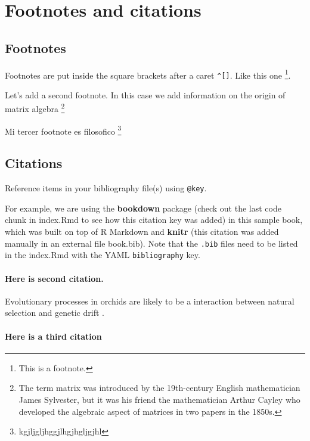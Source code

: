 \documentclass[
]{book}
\theoremstyle{definition}
\theoremstyle{definition}
\theoremstyle{definition}
\theoremstyle{definition}
\theoremstyle{remark}
\begin{document}
\hypertarget{footnotes-and-citations}{%
\chapter{Footnotes and citations}\label{footnotes-and-citations}}

\hypertarget{footnotes}{%
\section{Footnotes}\label{footnotes}}

Footnotes are put inside the square brackets after a caret \texttt{\^{}{[}{]}}. Like this one \footnote{This is a footnote.}.

Let's add a second footnote. In this case we add information on the origin of matrix algebra \footnote{The term matrix was introduced by the 19th-century English mathematician James Sylvester, but it was his friend the mathematician Arthur Cayley who developed the algebraic aspect of matrices in two papers in the 1850s.}

Mi tercer footnote es filosofico \footnote{kgjljgljhggjlhgjhgljgjhl}

\hypertarget{citations}{%
\section{Citations}\label{citations}}

Reference items in your bibliography file(s) using \texttt{@key}.

For example, we are using the \textbf{bookdown} package \citep{R-bookdown} (check out the last code chunk in index.Rmd to see how this citation key was added) in this sample book, which was built on top of R Markdown and \textbf{knitr} \citep{xie2015} (this citation was added manually in an external file book.bib).
Note that the \texttt{.bib} files need to be listed in the index.Rmd with the YAML \texttt{bibliography} key.

\hypertarget{here-is-second-citation.}{%
\subsubsection{Here is second citation.}\label{here-is-second-citation.}}

Evolutionary processes in orchids are likely to be a interaction between natural selection and genetic drift \citep{tremblay2005variation}.

\hypertarget{here-is-a-third-citation}{%
\subsubsection{Here is a third citation}\label{here-is-a-third-citation}}
\end{document}
